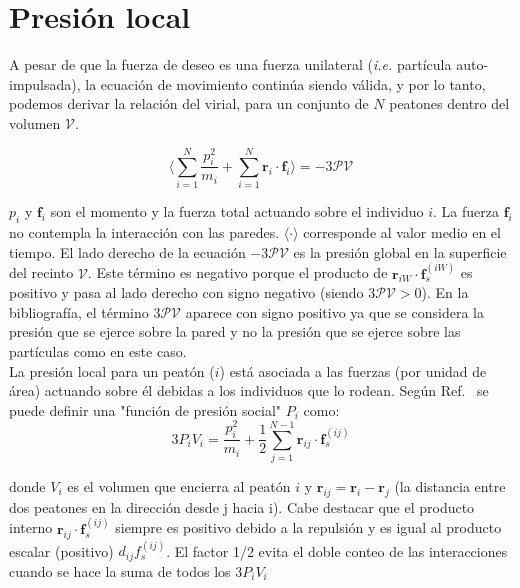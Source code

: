  
\section{Presión local}

A pesar de que la fuerza de deseo es una fuerza unilateral (\textit{i.e.} partícula auto-impulsada), la ecuación de movimiento continúa siendo válida, y por lo tanto, podemos derivar la relación del virial\cite{lion}, para un conjunto de $N$ peatones dentro del volumen $\mathcal{V}$.

\begin{equation}
 \bigg\langle\displaystyle\sum_{i=1}^N\displaystyle\frac{p_i^2}{m_i} + 
\displaystyle\sum_{i=1}^N 
\mathbf{r}_i\cdot\mathbf{f}_i\bigg\rangle=-3\mathcal{PV}\label{virial1}
\end{equation}


$p_i$  y $\mathbf{f}_i$ son el momento y la fuerza total actuando sobre el individuo $i$. La fuerza $\mathbf{f}_i$ no contempla la interacción con las paredes.  $\langle\cdot\rangle$ corresponde al valor medio en el tiempo. El lado derecho de la ecuación $-3\mathcal{PV}$ es la presión global en la superficie del recinto $\mathcal{V}$. Este término es negativo porque el producto de $\mathbf{r}_{iW}\cdot\mathbf{f}_s^{(iW)}$ es positivo y pasa al lado derecho con signo negativo (siendo $3\mathcal{PV}>0$). En la bibliografía, el término $3\mathcal{PV}$ aparece con signo positivo ya que se considera la presión que se ejerce sobre la pared y no la presión que se ejerce sobre las partículas como en este caso.  \\
La presión local para un peatón ($i$) está asociada a las fuerzas (por unidad de área) actuando sobre él debidas a los individuos que lo rodean. Según Ref.~\cite{lion} se puede definir una "función de presión social" $P_i$ como:\\

\begin{equation}
3P_iV_i=\displaystyle\frac{p_i^2}{m_i} + \frac{1}{2}
\displaystyle\sum_{j=1}^{N-1}
\mathbf{r}_{ij}\cdot\mathbf{f}_s^{(ij)}\label{pv}
\end{equation}

\noindent donde $V_i$ es el volumen que encierra al peatón $i$ y 
$\mathbf{r}_{ij}=\mathbf{r}_{i}-\mathbf{r}_j$ (la distancia
entre dos peatones en la dirección desde j hacia i). Cabe destacar que el producto interno $\mathbf{r}_{ij}\cdot\mathbf{f}_s^{(ij)}$ siempre es positivo debido a la repulsión y es igual al producto escalar (positivo) $d_{ij}f_s^{(ij)}$. El factor 1/2 evita el doble conteo de las interacciones cuando se hace la suma de todos los $3P_iV_i$ \\ 

